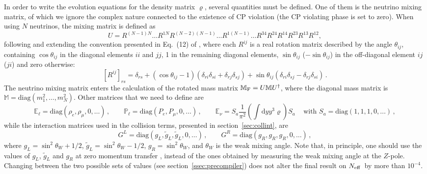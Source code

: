 \documentclass[notitlepage,nofootinbib,showpacs,preprintnumbers,amsmath,amssymb,superscriptaddress,prd,onecolumn]{revtex4-1}
\newcommand{\Neff}{\ensuremath{N_{\rm eff}}}
\begin{document}
In order to write the evolution equations for the density matrix $\varrho$,
several quantities must be defined.
One of them is the neutrino mixing matrix,
of which we ignore the complex nature connected to the existence of CP violation
(the CP violating phase is set to zero).
When using $N$ neutrinos,
the mixing matrix is defined as
%
\begin{equation}\label{eq:mixing_matrix_nxn}
U=R^{(N-1)N} \ldots R^{1N}
R^{(N-2)(N-1)}\ldots R^{1(N-1)}
\ldots
R^{34} R^{24} R^{14} R^{23} R^{13} R^{12},
\end{equation}
%
following and extending the convention presented in Eq.~(12) of \cite{Gariazzo:2015rra},
where each $R^{ij}$ is a real rotation matrix described by the angle $\theta_{ij}$,
containing $\cos\theta_{ij}$ in the diagonal elements $ii$ and $jj$,
1 in the remaining diagonal elements,
$\sin\theta_{ij}$ ($-\sin\theta_{ij}$) in the off-diagonal element $ij$ ($ji$)
and zero otherwise:
\begin{equation}
\label{eq:rotationmatrix}
[R^{ij}]_{rs}=
\delta_{rs}
+
(\cos\theta_{ij}-1)(\delta_{ri}\delta_{si}+\delta_{rj}\delta_{sj})
+
\sin\theta_{ij}(\delta_{ri}\delta_{sj}-\delta_{rj}\delta_{si})\,.
\end{equation}
The neutrino mixing matrix enters the calculation of the rotated mass matrix
$\mathbb{M}_{\rm F}=U\mathbb{M}U^\dagger$,
where the diagonal mass matrix is
$\mathbb{M}=\text{diag}(m_1^2,\ldots,m_N^2)$.
Other matrices that we need to define are
%
\begin{equation}\label{eq:matterpotentials_nxn}
\mathbb{E}_\ell=\text{diag}(\rho_e, \rho_\mu, 0, \ldots)\,,
\qquad
\mathbb{P}_\ell=\text{diag}(P_e, P_\mu, 0, \ldots)\,,
\qquad
\mathbb{E}_\nu=S_a\frac{1}{\pi^2}\left(\int \mathrm{d}y y^3\varrho\right) S_a\,
\quad\mbox{with }S_a=\text{diag}(1,1,1,0,\ldots)\,,
\end{equation}
while the interaction matrices used in the collision terms,
presented in section~\ref{sec:collint}, are
\begin{equation}
\label{eq:gLR}
G^L=\text{diag}(g_L, \tilde g_L, \tilde g_L, 0,\ldots)\,,
\qquad
G^R=\text{diag}(g_R, g_R, g_R, 0,\ldots)\,,
\end{equation}
%
where $g_L=\sin^2\theta_W+1/2$, $\tilde g_L=\sin^2\theta_W - 1/2$, $g_R=\sin^2\theta_W$,
and $\theta_W$ is the weak mixing angle.
Note that, in principle, one should use the values of $g_L$, $\tilde g_L$ and $g_R$
at zero momentum transfer \cite{Erler:2013xha},
instead of the ones obtained by measuring the weak mixing angle at the $Z$-pole.
Changing between the two possible sets of values (see section~\ref{ssec:precompiler})
does not alter the final result on \Neff\ by more than $10^{-4}$.
\end{document}
